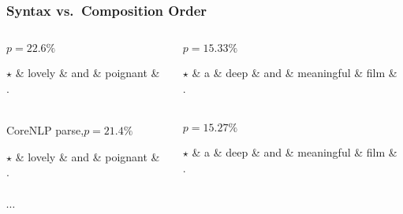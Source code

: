 \begin{frame}
\frametitle{Syntax vs.\ Composition Order}
\fontsize{9pt}{10}\selectfont%
\centering
\begin{columns}
\begin{column}{.5\textwidth}
\centering
{$p=22.6\%$}\\
\begin{dependency}[mydep]
\begin{deptext}[column sep=0.3cm]
$\star$ \& lovely \& and \& poignant \& . \\ \end{deptext}
\end{dependency}
\\[\baselineskip]
{CoreNLP parse,\quad$p=21.4\%$}\\
\begin{dependency}[mydep]
\begin{deptext}[column sep=0.3cm]
$\star$ \& lovely \& and \& poignant \& . \\ \end{deptext}
\end{dependency}\\
$\cdots$
\end{column}
\begin{column}{.5\textwidth}
\centering
{$p=15.33\%$}\\
\begin{dependency}[mydep,arc angle=35]
\begin{deptext}[column sep=0.3cm]
$\star$ \& a \& deep \& and \& meaningful \& film \& . \\ \end{deptext}
\end{dependency}\\[\baselineskip]
{$p=15.27\%$}\\
\begin{dependency}[mydep,arc angle=50]
\begin{deptext}[column sep=0.3cm]
$\star$ \& a \& deep \& and \& meaningful \& film \& . \\ \end{deptext}
\end{dependency}\\

\end{column}
\end{columns}
\end{frame}
